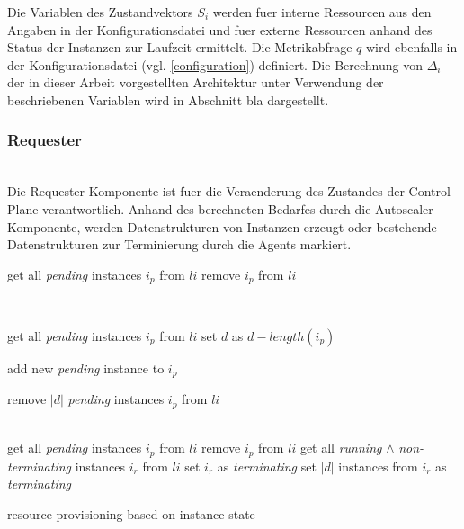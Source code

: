 \documentclass[runningheads]{llncs}
\begin{document}
Die Variablen des Zustandvektors $S_{i}$ werden fuer interne Ressourcen aus den Angaben in der Konfigurationsdatei und fuer externe Ressourcen anhand des Status der Instanzen zur Laufzeit ermittelt. Die Metrikabfrage $q$ wird ebenfalls in der Konfigurationsdatei (vgl. \ref{configuration}) definiert. Die Berechnung von $\Delta _{i}$ der in dieser Arbeit vorgestellten Architektur unter Verwendung der beschriebenen Variablen wird in Abschnitt bla dargestellt. 
	
\subsubsection{Requester}  \hfill\\

Die Requester-Komponente ist fuer die Veraenderung des Zustandes der Control-Plane verantwortlich. Anhand des berechneten Bedarfes durch die Autoscaler-Komponente, werden Datenstrukturen von Instanzen erzeugt oder bestehende Datenstrukturen zur Terminierung durch die Agents markiert.

\begin{algorithm}[H]
	\DontPrintSemicolon
	{
		get all \textit{pending} instances $i_{p}$ from $li$ \;
		remove $i_{p}$ from $li$ \;
	}
	
	\texttt{\\}
	{
		get all \textit{pending} instances $i_{p}$ from $li$ \;
		set $d$ as $d - length(i_{p})$ \;
		
		{
			
			{
				add new \textit{pending} instance to  $i_{p}$
			}
			
		}
	
		{
			remove $|d|$ \textit{pending} instances $i_{p}$ from $li$
		}
	}
	
	\texttt{\\}
	{
		get all \textit{pending} instances $i_{p}$ from $li$ \;
		remove $i_{p}$ from $li$ \;
		get all \textit{running} $\wedge$ \textit{non-terminating} instances $i_{r}$ from $li$ \;
		{
			set $i_{r}$ as \textit{terminating}
		}
		\Else 
		{
			set $|d|$ instances from $i_{r}$ as \textit{terminating}
		}
	}
	
	\caption{resource provisioning based on instance state}
\end{algorithm}
\end{document}
